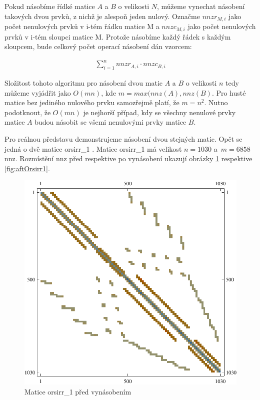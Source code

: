 Pokud násobíme řídké matice $A$ a $B$ o velikosti $N$, můžeme vynechat násobení takových dvou prvků, z nichž je alespoň jeden nulový. Označme $nnzr_{M,i}$ jako počet nenulových prvků v i-tém řádku matice M a $nnzc_{M,i}$ jako počet nenulových prvků v i-tém sloupci matice M. Protože násobíme každý řádek s každým sloupcem, bude celkový počet operací násobení dán vzorcem:

\begin{figure}[htb]
\begin{align}
\sum_{i=1}^{n} nnzr_{A,i} \cdot nnzc_{B,i}
\end{align}
\end{figure}

Složitost tohoto algoritmu pro násobení dvou matic $A$ a $B$ o velikosti $n$ tedy můžeme vyjádřit jako $O(mn)$, kde $m = max(nnz(A),nnz(B)$. Pro husté matice bez jediného nulového prvku samozřejmě platí, že $m=n^2$. Nutno podotknout, že $O(mn)$ je nejhorší případ, kdy se všechny nenulové prvky matice $A$ budou násobit se všemi nenulovými prvky matice $B$.

Pro reálnou představu demonstrujeme násobení dvou stejných matic. Opět se jedná o dvě matice orsirr\_1 \cite{mtxors}. Matice orsirr\_1 má velikost $n=1030$ a~$m=6858$ nnz. Rozmístění nnz před respektive po vynásobení ukazují obrázky \ref{fig:befOrsirr1} respektive \ref{fig:aftOrsirr1}.


\begin{figure}[htb]
	\includegraphics[width=1.0\textwidth]{./images/orsirr_1_orig}
	\caption{Matice orsirr\_1 před vynásobením}
	\label{fig:befOrsirr1}
\end{figure}

